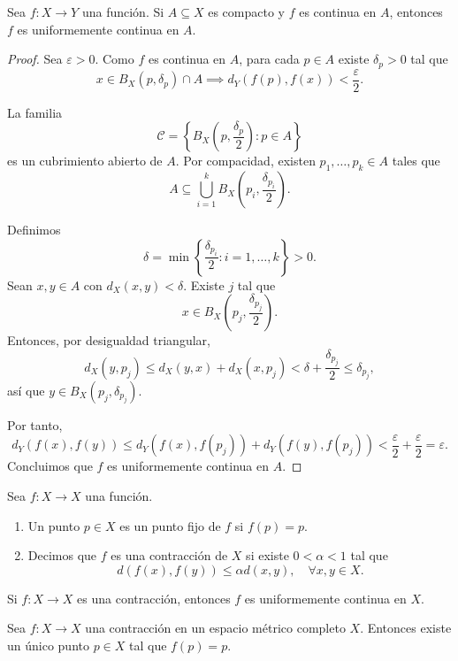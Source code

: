 \begin{teorema}
Sea $f:X\to Y$ una función. Si $A\subseteq X$ es compacto y $f$ es continua en $A$, entonces $f$ es uniformemente continua en $A$.
\end{teorema}

\begin{proof}
Sea $\varepsilon>0$. Como $f$ es continua en $A$, para cada $p\in A$ existe $\delta_p>0$ tal que
\[
x\in B_X(p,\delta_p)\cap A \implies d_Y(f(p),f(x))<\frac{\varepsilon}{2}.
\]

La familia
\[
\mathcal{C}=\left\{B_X\left(p,\frac{\delta_p}{2}\right):p\in A\right\}
\]
es un cubrimiento abierto de $A$. Por compacidad, existen $p_1,\dots,p_k\in A$ tales que
\[
A\subseteq\bigcup_{i=1}^k B_X\left(p_i,\frac{\delta_{p_i}}{2}\right).
\]

Definimos
\[
\delta=\min\left\{\frac{\delta_{p_i}}{2}:i=1,\dots,k\right\}>0.
\]
Sean $x,y\in A$ con $d_X(x,y)<\delta$. Existe $j$ tal que
\[
x\in B_X\left(p_j,\frac{\delta_{p_j}}{2}\right).
\]
Entonces, por desigualdad triangular,
\[
d_X(y,p_j)\le d_X(y,x)+d_X(x,p_j)<\delta+\frac{\delta_{p_j}}{2}\le\delta_{p_j},
\]
así que $y\in B_X(p_j,\delta_{p_j})$.

Por tanto,
\[
d_Y(f(x),f(y))\le d_Y(f(x),f(p_j))+d_Y(f(y),f(p_j))<\frac{\varepsilon}{2}+\frac{\varepsilon}{2}=\varepsilon.
\]
Concluimos que $f$ es uniformemente continua en $A$.
\end{proof}

\begin{definicion}
Sea $f:X\to X$ una función.
\begin{enumerate}
    \item Un punto $p\in X$ es un punto fijo de $f$ si $f(p)=p$.
    \item Decimos que $f$ es una contracción de $X$ si existe $0<\alpha<1$ tal que
    \[
    d(f(x),f(y))\le \alpha d(x,y),\quad \forall x,y\in X.
    \]
\end{enumerate}
\end{definicion}

\begin{remark}
Si $f:X\to X$ es una contracción, entonces $f$ es uniformemente continua en $X$.
\end{remark}

\begin{teorema}
Sea $f:X\to X$ una contracción en un espacio métrico completo $X$.
Entonces existe un único punto $p\in X$ tal que $f(p)=p$.
\end{teorema}
